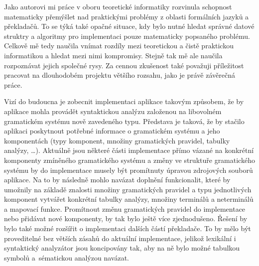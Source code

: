 Jako autorovi mi práce v oboru teoretické informatiky rozvinula schopnost matematicky přemýšlet nad praktickými problémy z oblasti formálních jazyků a překladačů. To se týká také opačné situace,
kdy bylo  nutné hledat správné datové struktry a algoritmy pro implementaci pouze matematicky popsaného problému. Celkově mě tedy naučila vnímat
rozdíly mezi teoretickou a čistě praktickou informatikou a hledat mezi nimi kompromisy. Stejně tak mě ale naučila rozpoznávat jejich společné rysy.
Za cennou zkušenost také považuji příležitost pracovat na dlouhodobém projektu většího rozsahu, jako je právě závěrečná práce.

Vizí do budoucna je zobecnit implementaci aplikace takovým způsobem, že by aplikace mohla provádět syntaktickou analýzu založenou na libovolném gramatickém systému nově zavedeného typu.
Představa je taková, že by stačilo aplikaci poskytnout potřebné informace o gramatickém systému a jeho komponentách (typy komponent, množiny gramatických pravidel, tabulky
analýzy, \dots). Aktuálně jsou některé části implementace přímo vázané na konkrétní komponenty zmíněného gramatického systému a změny ve struktuře gramatického systému by do implementace
musely být promítnuty úpravou zdrojových souborů aplikace. Na to by následně mohlo navázat doplnění funkcionalit, které by umožnily na základě znalosti množiny gramatických pravidel a typu
jednotlivých komponent vytvářet konkrétní tabulky analýzy, množiny terminálů a neterminálů a mapovací funkce. Promítnout změnu gramatických pravidel do implementace nebo přidávat nové komponenty,
by tak bylo ještě více zjednodušeno. Řešení by bylo také možné rozšířit o implementaci dalších částí překladače. To by mělo být proveditelné bez větších zásahů do aktuální
implementace, jelikož lexikální i syntaktický analyzátor jsou koncipovány tak, aby na ně bylo možné tabulkou symbolů a~sématickou analýzou navázat.